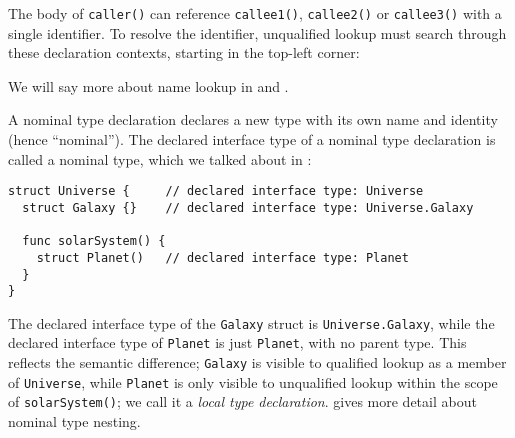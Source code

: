 \documentclass[../generics]{subfiles}
\begin{document}
The body of \texttt{caller()} can reference \texttt{callee1()}, \texttt{callee2()} or \texttt{callee3()} with a single identifier. To resolve the identifier, unqualified lookup must search through these declaration contexts, starting in the top-left corner:
\begin{center}
\end{center}
We will say more about name lookup in  and .

A nominal type declaration declares a new type with its own name and identity (hence ``nominal''). The declared interface type of a nominal type declaration is called a nominal type, which we talked about in :
\begin{Verbatim}
struct Universe {     // declared interface type: Universe
  struct Galaxy {}    // declared interface type: Universe.Galaxy

  func solarSystem() {
    struct Planet()   // declared interface type: Planet
  }
}
\end{Verbatim}
The declared interface type of the \texttt{Galaxy} struct is \texttt{Universe.Galaxy}, while the declared interface type of \texttt{Planet} is just \texttt{Planet}, with no parent type. This reflects the semantic difference; \texttt{Galaxy} is visible to qualified lookup as a member of \texttt{Universe}, while \texttt{Planet} is only visible to unqualified lookup within the scope of \texttt{solarSystem()}; we call it a \emph{local type declaration}.  gives more detail about nominal type nesting.
\end{document}
